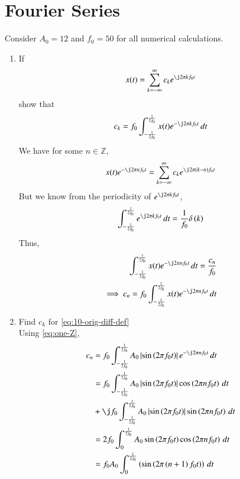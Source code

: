\documentclass[journal,12pt,twocolumn]{IEEEtran}
\renewcommand\thesection{\arabic{section}}
\begin{document}
\section{Fourier Series}
Consider $A_0 =12$ and $f_0 = 50$ for all numerical calculations.
\begin{enumerate}[label=\thesection.\arabic*,ref=\thesection.\theenumi]
\item If
\begin{align}
	x(t) = \sum_{k = -\infty}^{\infty}c_ke^{\j2\pi kf_0 t}
\label{eq:one-Z-complex}
\end{align}
show that 
\begin{align}
	c_k = f_0\int_{-\frac{1}{2f_0}}^{\frac{1}{2f_0}}x(t)e^{-\j2\pi kf_0 t}\, dt
\label{eq:one-Z}
\end{align}
\solution We have for some $n \in \mathbb{Z}$,
\begin{align}
    x(t)e^{-\j2\pi nf_0t} = \sum_{k = -\infty}^{\infty}c_ke^{\j2\pi (k - n)f_0 t}
\end{align}
But we know from the periodicity of $e^{\j2\pi kf_0t}$,
\begin{align}
    \int_{-\frac{1}{2f_0}}^{\frac{1}{2f_0}}e^{\j2\pi kf_0 t}\, dt = 
    \frac{1}{f_0}\delta\brak{k} 
\end{align}
Thus,
\begin{align}
    \int_{-\frac{1}{2f_0}}^{\frac{1}{2f_0}}x(t)e^{-\j2\pi nf_0 t}\, dt = 
    \frac{c_n}{f_0} \\
    \implies c_n = f_0\int_{-\frac{1}{2f_0}}^{\frac{1}{2f_0}}x(t)e^{-\j2\pi nf_0 t}\, dt 
\end{align}
	\item Find $c_k$ for 
	\eqref{eq:10-orig-diff-def}\\
	\solution Using \eqref{eq:one-Z},
\begin{align}
    c_n &= f_0\int_{-\frac{1}{2f_0}}^{\frac{1}{2f_0}}A_0\abs{\sin\brak{2\pi f_0t}}
    e^{-\j2\pi nf_0t}\, dt \\
        &= f_0\int_{-\frac{1}{2f_0}}^{\frac{1}{2f_0}}A_0\abs{\sin\brak{2\pi f_0t}}
    \cos\brak{2\pi nf_0t}\, dt \nonumber \\
        &+ \j f_0\int_{-\frac{1}{2f_0}}^{\frac{1}{2f_0}}A_0
        \abs{\sin\brak{2\pi f_0t}}\sin\brak{2\pi nf_0t}\, dt \\
        &= 2f_0\int_{0}^{\frac{1}{2f_0}}A_0\sin\brak{2\pi f_0t}\cos\brak{2\pi nf_0t}\, dt \\
        &= f_0A_0\int_{0}^{\frac{1}{2f_0}}\brak{\sin\brak{2\pi\brak{n+1}f_0t}}\, dt \nonumber \\ 

\end{align}
\end{enumerate}
\end{document}

